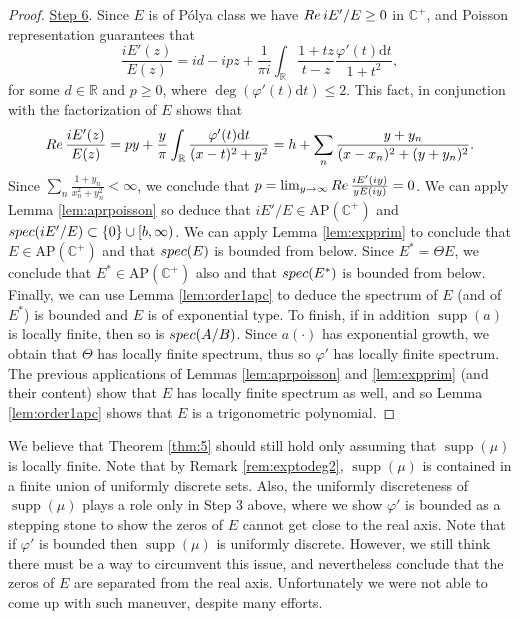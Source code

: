 \documentclass[a4paper,reqno,12pt]{amsart}
\DeclareMathOperator{\supp}{\mathrm{supp}}
\renewcommand{\H}{\mathbb{C}^+}
\renewcommand{\r}{\mathbb{R}}
\newcommand{\re}{{\rm Re}\,}
\newcommand{\p}{\varphi}
\renewcommand{\d}{\mathrm{d}}
\newcommand{\1}{{\bf 1}}
\newcommand{\apc}{\mathrm{AP}(\H)}
\renewcommand{\1}{{\bo 1}}
\newcommand{\spec}{{\rm spec}}
\renewcommand{\a}{a(\cdot)}
\begin{document}
\begin{proof}
\underline{Step 6}. Since $E$ is of P\'olya class we have $\re iE'/E\geq 0$ in $\H$, and Poisson representation guarantees that
$$
\frac{iE'(z)}{E(z)} =  id - ipz + \frac{1}{\pi i} \int_\r \frac{1+tz}{t-z}\frac{\p'(t)\d t}{1+t^2},
$$
for some $d\in \r$ and $p\geq 0$, where  $\deg(\p'(t)\d t) \leq 2$. This fact, in conjunction with the factorization of $E$ shows that
$$
\re \frac{iE'(z)}{E(z)} = py + \frac{y}{\pi} \int_\r \frac{\p'(t)\d t}{(x-t)^2+y^2} = h + \sum_{n}\frac{y+y_n}{(x-x_n)^2+(y+y_n)^2}.
$$
Since $\sum_{n} \frac{1+y_n}{x_n^2+y_n^2}<\infty$, we conclude that $p=\lim_{y\to\infty} \re \frac{iE'(iy)}{yE(iy)}=0$. We can apply Lemma \ref{lem:aprpoisson} so deduce that $iE'/E\in \apc$ and $\spec(iE'/E)\subset \{0\}\cup [b,\infty) $. We can apply Lemma \ref{lem:expprim} to conclude that $E\in \apc$ and that $\spec(E)$ is bounded from below. Since $E^*=\Theta E$, we conclude that $E^*\in \apc$ also and that $\spec(E^*)$ is bounded from below. Finally, we can use Lemma \ref{lem:order1apc} to deduce the spectrum of $E$ (and of $E^*$) is bounded and $E$ is of exponential type. To finish, if in addition $\supp(a)$ is locally finite, then so is $\spec(A/B)$. Since $\a$ has exponential growth, we obtain that $\Theta$ has locally finite spectrum, thus so $\p'$ has locally finite spectrum. The previous applications of Lemmas \ref{lem:aprpoisson} and \ref{lem:expprim} (and their content) show that $E$ has locally finite spectrum as well, and so Lemma \ref{lem:order1apc} shows that $E$ is a trigonometric polynomial.
\end{proof}

We believe that Theorem \ref{thm:5} should still hold only assuming that $\supp(\mu)$ is locally finite. Note that by Remark \ref{rem:exptodeg2}, $\supp(\mu)$ is contained in a finite union of uniformly discrete sets. Also, the uniformly discreteness of $\supp(\mu)$ plays a role only in Step 3 above, where we show $\p'$ is bounded as a stepping stone to show the zeros of $E$ cannot get close to the real axis. Note that if $\p'$ is bounded then $\supp(\mu)$ is uniformly discrete. However, we still think there must be a way to circumvent this issue, and nevertheless conclude that the zeros of $E$ are separated from the real axis. Unfortunately we were not able to come up with such maneuver, despite many efforts.
\end{document}

